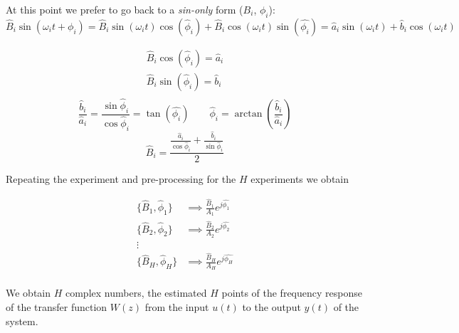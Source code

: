 At this point we prefer to go back to a \emph{sin-only} form ($B_i$, $\phi_i$):
\[
    \hat{B}_i\sin(\omega_it + \phi_i) = \hat{B}_i\sin(\omega_it)\cos(\hat{\phi}_i) + \hat{B}_i\cos(\omega_it)\sin(\hat{\phi_i}) = \hat{a}_i\sin(\omega_it) + \hat{b}_i\cos(\omega_it)
\]

\begin{align*}
    \hat{B}_i\cos(\hat{\phi}_i) = \hat{a}_i \\
    \hat{B}_i\sin(\hat{\phi}_i) = \hat{b}_i \\
\end{align*}
\[
    \frac{\hat{b}_i}{\hat{a}_i} = \frac{\sin\hat{\phi}_i}{\cos{\hat{\phi}_i}} = \tan(\hat{\phi_i}) \qquad \hat{\phi}_i = \arctan \left( \frac{\hat{b}_i}{\hat{a}_i} \right)
\]
\[
    \hat{B}_i = \frac{\frac{\hat{a}_i}{\cos\hat{\phi}_i} + \frac{\hat{b}_i}{\sin\hat{\phi}_i}}{2}
\]

Repeating the experiment and pre-processing for the $H$ experiments we obtain

\begin{align*}
    \{ \hat{B}_1, \hat{\phi}_1 \} &\implies \frac{\hat{B}_1}{A_1} e^{j\hat{\phi_1}} \\
    \{ \hat{B}_2, \hat{\phi}_2 \} &\implies \frac{\hat{B}_2}{A_2} e^{j\hat{\phi_2}} \\
    \vdots& \\
    \{ \hat{B}_H, \hat{\phi}_H \} &\implies \frac{\hat{B}_H}{A_H} e^{j\hat{\phi_H}} \\
\end{align*}

We obtain $H$ complex numbers, the estimated $H$ points of the frequency response of the transfer function $W(z)$ from the input $u(t)$ to the output $y(t)$ of the system.

\begin{figure}[H]
    \centering
\end{figure}

